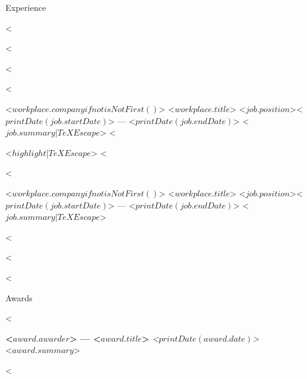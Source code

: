 \documentclass{resume} %
\begin{document}
\begin{rSection}{Experience}

<%

<%

<%

<%
\begin{rSubsection}{<$ workplace.company  if not isNotFirst() $>}{ <$ workplace.title $> }{<$ job.position $>}{<$ printDate(job.startDate) $> --- <$ printDate(job.endDate) $>}
{ <$ job.summary | TeXEscape $> }
<%
\item <$ highlight | TeXEscape $>
<%
\end{rSubsection}

<%

\begin{rSubsectionNoList}{<$ workplace.company  if not isNotFirst() $>}{ <$ workplace.title $> }{<$ job.position $>}{<$ printDate(job.startDate) $> --- <$ printDate(job.endDate) $>}
{ <$ job.summary | TeXEscape $> }
\end{rSubsectionNoList}

<%

<%

<%

\end{rSection}


\begin{rSection}{Awards}

<%

{\bf <$ award.awarder $> --- <$ award.title $>} \hfill {\em <$ printDate(award.date) $>} \\ 
<$ award.summary $>

<%


\end{rSection}






\end{document}
